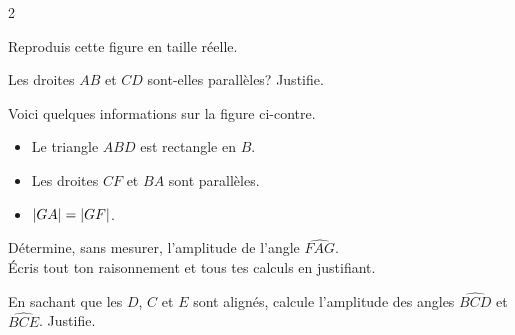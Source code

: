 \documentclass[../math2.tex]{subfiles}
\begin{document}
\setlength{\columnsep}{20pt}
\begin{multicols}{2}
\begin{exercise}
    Reproduis cette figure en taille réelle.
    \begin{center}
        
    \end{center}
\end{exercise}

\begin{exercise}
    Les droites $AB$ et $CD$ sont-elles parallèles? Justifie.
    \begin{center}
        
    \end{center}
\end{exercise}
\end{multicols}
\setlength{\columnsep}{10pt}
\begin{exercise}
        Voici quelques informations sur la figure ci-contre.
        \begin{itemize}
            \item Le triangle $ABD$ est rectangle en $B$.
            \item Les droites $CF$ et $BA$ sont parallèles.
            \item $\abs{GA} = \abs{GF}$.
        \end{itemize}
        Détermine, sans mesurer, l'amplitude de l'angle $\widehat{FAG}$.\\
    Écris tout ton raisonnement et tous tes calculs en justifiant.
    \begin{center}
        
    \end{center}

    
\end{exercise}
\begin{exercise}
    En sachant que les $D$, $C$ et $E$ sont alignés, calcule l'amplitude
    des angles $\widehat{BCD}$ et $\widehat{BCE}$. Justifie.
    \begin{center}
        
    \end{center}
\end{exercise}
\end{document}
